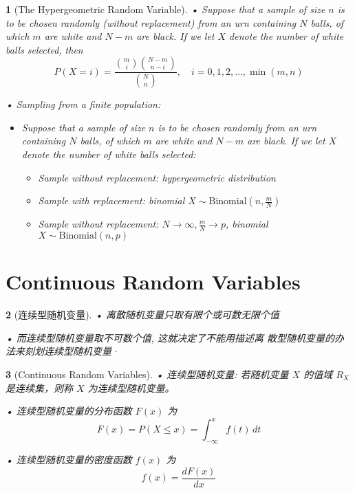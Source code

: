 \documentclass[UTF8]{report}
\theoremstyle{MyLineTheoremStyle} %
\theoremstyle{MyBlockTheoremStyle} %
\theoremstyle{MySubsubsectionStyle} %
\newtheorem{definition}{}
\begin{document}
\begin{definition}[The Hypergeometric Random Variable]
    • Suppose that a sample of size \(n\) is to be chosen randomly 
    (without replacement) from an urn containing \(N\) balls, of which 
    \(m\) are white and \(N - m\) are black. If we let \(X\) denote the 
    number of white balls selected, then
    \[
    P(X = i) = \frac{\binom{m}{i} \binom{N - m}{n - i}}{\binom{N}{n}}, \quad i = 0, 1, 2, \ldots, \min(m, n)
    \]\par
    • Sampling from a finite population:
    \begin{itemize}
        \item Suppose that a sample of size \(n\) is to be chosen randomly from 
        an urn containing \(N\) balls, of which \(m\) are white and \(N - m\) are 
        black. If we let \(X\) denote the number of white balls selected:
        \begin{itemize}
            \item Sample without replacement: hypergeometric distribution
            \item Sample with replacement: binomial \(X \sim \text{Binomial}(n, \frac{m}{N})\)
            \item Sample without replacement: \(N \to \infty, \frac{m}{N} \to p\), binomial \(X \sim \text{Binomial}(n, p)\)
        \end{itemize}
    \end{itemize}
\end{definition}


\section{Continuous Random Variables}

\begin{definition}[连续型随机变量]
    • 离散随机变量只取有限个或可数无限个值\par
    • 而连续型随机变量取不可数个值, 这就决定了不能用描述离
散型随机变量的办法来刻划连续型随机变量·
\end{definition}


\begin{definition}[Continuous Random Variables]
    • 连续型随机变量: 若随机变量 \(X\) 的值域 \(R_X\) 是连续集，则称 \(X\) 为连续型随机变量。\par
    • 连续型随机变量的分布函数 \(F(x)\) 为
    \[
    F(x) = P(X \leq x) = \int_{-\infty}^{x} f(t) \, dt
    \]\par
    • 连续型随机变量的密度函数 \(f(x)\) 为
    \[
    f(x) = \frac{dF(x)}{dx}
    \]\par
   
  
\end{definition}
\end{document}
